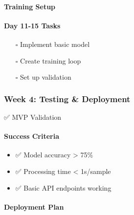 \paragraph{Training Setup}\label{training-setup}

\begin{Shaded}
\begin{Highlighting}[]
\KeywordTok{:}
\AttributeTok{  }\KeywordTok{:}\AttributeTok{ }
\AttributeTok{  }\KeywordTok{:}\AttributeTok{ }
\AttributeTok{  }\KeywordTok{:}\AttributeTok{ }
\AttributeTok{  }\KeywordTok{:}\AttributeTok{ }
\end{Highlighting}
\end{Shaded}

\paragraph{Day 11-15 Tasks}\label{day-11-15-tasks}

\begin{itemize}
\tightlist
\item[$\square$]
  Implement basic model
\item[$\square$]
  Create training loop
\item[$\square$]
  Set up validation
\end{itemize}

\subsubsection{Week 4: Testing \&
Deployment}\label{week-4-testing-deployment}

✅ MVP Validation

\paragraph{Success Criteria}\label{success-criteria}

\begin{itemize}
\tightlist
\item
  ✅ Model accuracy \textgreater{} 75\%
\item
  ✅ Processing time \textless{} 1s/sample
\item
  ✅ Basic API endpoints working
\end{itemize}

\paragraph{Deployment Plan}\label{deployment-plan}


